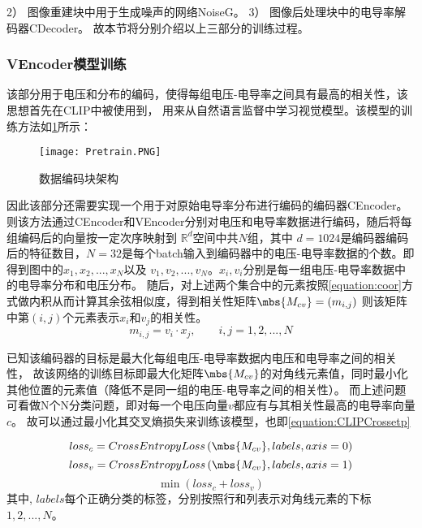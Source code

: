 2） 图像重建块中用于生成噪声的网络NoiseG。
3） 图像后处理块中的电导率解码器CDecoder。
故本节将分别介绍以上三部分的训练过程。

\subsubsection{VEncoder模型训练}

该部分用于电压和分布的编码，使得每组电压-电导率之间具有最高的相关性，该思想首先在CLIP中被使用到\cite{CLIP}，
用来从自然语言监督中学习视觉模型。该模型的训练方法如\cref{figure:Pretrain}所示：

\begin{figure}[H]
    \centering
    \texttt{[image: Pretrain.PNG]}
    \caption{数据编码块架构}
    \label{figure:Pretrain}
\end{figure}
因此该部分还需要实现一个用于对原始电导率分布进行编码的编码器CEncoder。
则该方法通过CEncoder和VEncoder分别对电压和电导率数据进行编码，随后将每组编码后的向量按一定次序映射到 $\mathbb{R}^d$空间中共$N$组，其中
$d=1024$是编码器编码后的特征数目，$N=32$是每个batch输入到编码器中的电压-电导率数据的个数。即得到图中的$x_1, x_2,...,x_N$以及
$v_1, v_2,..., v_N$。$x_i,v_i$分别是每一组电压-电导率数据中的电导率分布和电压分布。
随后，对上述两个集合中的元素按照\cref{equation:coor}方式做内积从而计算其余弦相似度，得到相关性矩阵$\mbs{M_{cv}}= \left(m_{i,j}\right)$
则该矩阵中第$(i,j)$个元素表示$x_i$和$v_j$的相关性。
\begin{equation}
    \label{equation:coor}
    m_{i,j} = v_{i} \cdot x_{j}, \qquad i,j=1,2,...,N
\end{equation}


已知该编码器的目标是最大化每组电压-电导率数据内电压和电导率之间的相关性，
故该网络的训练目标即最大化矩阵$\mbs{M_{cv}}$的对角线元素值，同时最小化其他位置的元素值（降低不是同一组的电压-电导率之间的相关性）。
而上述问题可看做N个N分类问题，即对每一个电压向量$v$都应有与其相关性最高的电导率向量$c$。
故可以通过最小化其交叉熵损失来训练该模型，也即\cref{equation:CLIPCrossetp}

\begin{equation}
    loss_c = CrossEntropyLoss \left(\mbs{M_{cv}}, labels, axis=0\right)
\end{equation}
\begin{equation}
    loss_v = CrossEntropyLoss \left(\mbs{M_{cv}}, labels, axis=1\right)
\end{equation}
\begin{equation}
    \label{equation:CLIPCrossetp}
    \min \left(loss_c + loss_v\right)
\end{equation}
其中, $labels$每个正确分类的标签，分别按照行和列表示对角线元素的下标$1,2,...,N$。

